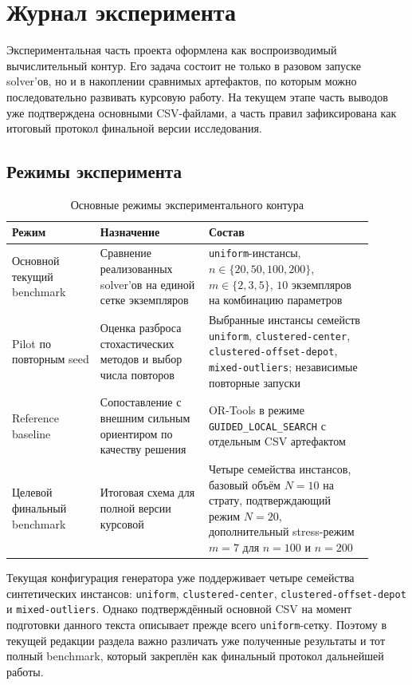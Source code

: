 \documentclass[a4paper,12pt]{article}
\begin{document}
\section{Журнал эксперимента}

Экспериментальная часть проекта оформлена как воспроизводимый вычислительный контур. Его задача состоит не только в разовом запуске solver'ов, но и в накоплении сравнимых артефактов, по которым можно последовательно развивать курсовую работу. На текущем этапе часть выводов уже подтверждена основными CSV-файлами, а часть правил зафиксирована как итоговый протокол финальной версии исследования.

\subsection{Режимы эксперимента}

\begin{table}[H]
\centering
\caption{Основные режимы экспериментального контура}
\begin{tabular}{L{0.22\linewidth}L{0.27\linewidth}L{0.41\linewidth}}
\toprule
Режим & Назначение & Состав \\
\midrule
Основной текущий benchmark & Сравнение реализованных solver'ов на единой сетке экземпляров & \texttt{uniform}-инстансы, \(n \in \{20,50,100,200\}\), \(m \in \{2,3,5\}\), \(10\) экземпляров на комбинацию параметров \\
Pilot по повторным seed & Оценка разброса стохастических методов и выбор числа повторов & Выбранные инстансы семейств \texttt{uniform}, \texttt{clustered-center}, \texttt{clustered-offset-depot}, \texttt{mixed-outliers}; независимые повторные запуски \\
Reference baseline & Сопоставление с внешним сильным ориентиром по качеству решения & OR-Tools в режиме \texttt{GUIDED\_LOCAL\_SEARCH} с отдельным CSV артефактом \\
Целевой финальный benchmark & Итоговая схема для полной версии курсовой & Четыре семейства инстансов, базовый объём \(N=10\) на страту, подтверждающий режим \(N=20\), дополнительный stress-режим \(m=7\) для \(n=100\) и \(n=200\) \\
\bottomrule
\end{tabular}
\end{table}

Текущая конфигурация генератора уже поддерживает четыре семейства синтетических инстансов: \texttt{uniform}, \texttt{clustered-center}, \texttt{clustered-offset-depot} и \texttt{mixed-outliers}. Однако подтверждённый основной CSV на момент подготовки данного текста описывает прежде всего \texttt{uniform}-сетку. Поэтому в текущей редакции раздела важно различать уже полученные результаты и тот полный benchmark, который закреплён как финальный протокол дальнейшей работы.
\end{document}
